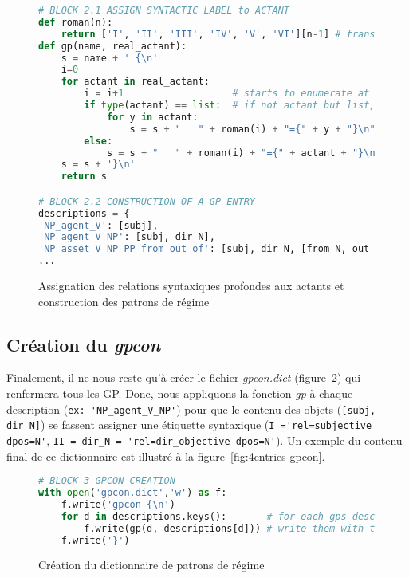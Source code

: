 \begin{figure}[htb]
\begin{lstlisting}[language=Python]
# BLOCK 2.1 ASSIGN SYNTACTIC LABEL to ACTANT
def roman(n):
    return ['I', 'II', 'III', 'IV', 'V', 'VI'][n-1] # transforms arabic numbers in roman numbers
def gp(name, real_actant):
    s = name + ' {\n'
    i=0
    for actant in real_actant:
        i = i+1                   # starts to enumerate at 1
        if type(actant) == list:  # if not actant but list, apply function to actants in list
            for y in actant:
                s = s + "   " + roman(i) + "={" + y + "}\n"
        else:
            s = s + "   " + roman(i) + "={" + actant + "}\n" # apply function to actant
    s = s + '}\n'
    return s 

# BLOCK 2.2 CONSTRUCTION OF A GP ENTRY
descriptions = {
'NP_agent_V': [subj],
'NP_agent_V_NP': [subj, dir_N],
'NP_asset_V_NP_PP_from_out_of': [subj, dir_N, [from_N, out_of_N]],
...
\end{lstlisting}
\caption{Assignation des relations syntaxiques profondes aux actants et construction des patrons de régime}
\label{fig:assignationrel}
\end{figure}

\subsection{Création du \emph{gpcon}}

Finalement, il ne nous reste qu'à créer le fichier \emph{gpcon.dict} (figure~\ref{fig:creationgpcon}) qui renfermera tous les \ac{GP}. Donc, nous appliquons la fonction \emph{gp} à chaque description (\lstinline|ex: 'NP_agent_V_NP'|) pour que le contenu des objets (\lstinline|[subj, dir_N]|) se fassent assigner une étiquette syntaxique (\lstinline|I ='rel=subjective dpos=N'|, \lstinline|II = dir_N = 'rel=dir_objective dpos=N'|). Un exemple du contenu final de ce dictionnaire est illustré à la figure~\ref{fig:4entries-gpcon}.

\begin{figure}[htb]
\begin{lstlisting}[language=Python]
# BLOCK 3 GPCON CREATION
with open('gpcon.dict','w') as f: 
    f.write('gpcon {\n')
    for d in descriptions.keys():       # for each gps descriptions,
        f.write(gp(d, descriptions[d])) # write them with the correct syntactic label
    f.write('}')
\end{lstlisting}
\caption{Création du dictionnaire de patrons de régime}
\label{fig:creationgpcon}
\end{figure}


